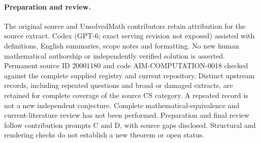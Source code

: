 \documentclass[11pt]{article}
\begin{document}
\paragraph{Preparation and review.}
The original source and UnsolvedMath contributors retain attribution for the source extract. Codex (GPT-6; exact serving revision not exposed) assisted with definitions, English summaries, scope notes and formatting. No new human mathematical authorship or independently verified solution is asserted. Permanent source ID 20001180 and code AIM-COMPUTATION-0018 checked against the complete supplied registry and current repository. Distinct upstream records, including repeated questions and broad or damaged extracts, are retained for complete coverage of the source CS category. A repeated record is not a new independent conjecture. Complete mathematical-equivalence and current-literature review has not been performed. Preparation and final review follow contribution prompts C and D, with source gaps disclosed. Structural and rendering checks do not establish a new theorem or open status.
\label{end:20001180}
\end{document}
